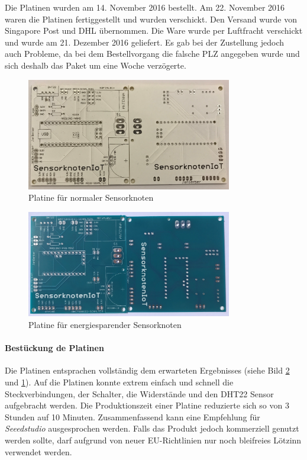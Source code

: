 Die Platinen wurden am 14. November 2016 bestellt. Am 22. November 2016 waren die Platinen fertiggestellt und wurden verschickt. Den Versand wurde von Singapore Post und DHL übernommen. Die Ware wurde per Luftfracht verschickt und wurde am 21. Dezember 2016 geliefert. Es gab bei der Zustellung jedoch auch Probleme, da bei dem Bestellvorgang die falsche PLZ angegeben wurde und sich deshalb das Paket um eine Woche verzögerte.
\begin{figure}
	\centering
	\includegraphics[width=0.8\textwidth]{bilder/platineArduinoNano}
	\caption{Platine für normaler Sensorknoten}
	\label{img:PlatineArduinoNano}
\end{figure}
\begin{figure}
	\centering
	\includegraphics[width=0.8\textwidth]{bilder/platineArduinoProMini}
	\caption{Platine für energiesparender Sensorknoten}
	\label{img:PlatineArduinoProMini}
\end{figure}

\paragraph{Bestückung de Platinen} Die Platinen entsprachen vollständig dem erwarteten Ergebnisses (siehe Bild \ref{img:PlatineArduinoProMini} und \ref{img:PlatineArduinoNano}). Auf die Platinen konnte extrem einfach und schnell die Steckverbindungen, der Schalter, die Widerstände und den DHT22 Sensor aufgebracht werden. Die Produktionszeit einer Platine reduzierte sich so von 3 Stunden auf 10 Minuten. Zusammenfassend kann eine Empfehlung für \textit{Seeedstudio} ausgesprochen werden. Falls das Produkt jedoch kommerziell genutzt werden sollte, darf aufgrund von neuer EU-Richtlinien nur noch bleifreies Lötzinn verwendet werden. 
